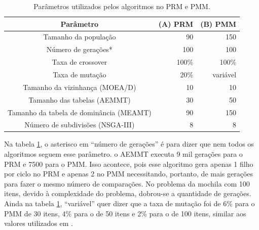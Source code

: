 \begin{table}[!htbp]
	\caption{Parâmetros utilizados pelos algoritmos no PRM e PMM.}
	\label{table_exp1_parametros}
	\begin{center}
		\begin{tabular}{c|r|r}
			\textbf{Parâmetro} & \textbf{(A) PRM} &  \textbf{(B) PMM} \\ %
			\hline
			Tamanho da população                    &    90 &      150 \\ %
			Número de gerações*                     &   100 &      100 \\ %
			Taxa de crossover                       & 100\% &    100\% \\ %
			Taxa de mutação                         &  20\% & variável \\ %
			Tamanho da vizinhança (MOEA/D)          &    10 &       10 \\ %
			Tamanho das tabelas (AEMMT)             &    30 &       50 \\ %
			Tamanho da tabela de dominância (MEAMT) &    90 &      150 \\ %
			Número de subdivisões (NSGA-III)        &     8 &        8 \\
			\hline
		\end{tabular}
	\end{center}
\end{table}

Na tabela \ref{table_exp1_parametros}, o asterisco em ``número de gerações'' é para dizer que nem todos os algoritmos seguem esse parâmetro. o AEMMT executa 9 mil gerações para o PRM e 7500 para o PMM. Isso acontece, pois esse algoritmo gera apenas 1 filho por ciclo no PRM e apenas 2 no PMM necessitando, portanto, de mais gerações para fazer o mesmo número de comparações. No problema da mochila com 100 itens, devido à complexidade do problema, dobrou-se a quantidade de gerações. Ainda na tabela \ref{table_exp1_parametros}, ``variável'' quer dizer que a taxa de mutação foi de 6\% para o PMM de 30 itens, 4\% para o de 50 itens e 2\% para o de 100 itens, similar aos valores utilizados em \cite{Ishibuchi2015}.

